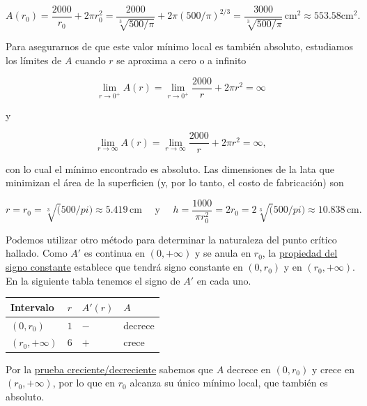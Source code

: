 \documentclass[
  letterpaper,
]{book}
\theoremstyle{plain}
\theoremstyle{remark}
\begin{document}
\begin{tcolorbox}
\[
A(r_0)=\frac{2000}{r_0}+2\pi r_0^2=\frac{2000}{\sqrt[3]{500/\pi}}+2\pi (500/\pi)^{2/3}=\frac{3000}{\sqrt[3]{500/\pi}}\, \mathrm{cm}^2 \approx 553.58 \mathrm{cm}^2.
\]

Para asegurarnos de que este valor mínimo local es también absoluto,
estudiamos los límites de \(A\) cuando \(r\) se aproxima a cero o a
infinito

\[
\lim_{r\to 0^+} A(r)=\lim_{r\to 0^+} \frac{2000}{r}+2\pi r^2=\infty
\]

y

\[
\lim_{r\to \infty} A(r)=\lim_{r\to \infty} \frac{2000}{r}+2\pi r^2=\infty,
\]

con lo cual el mínimo encontrado es absoluto. Las dimensiones de la lata
que minimizan el área de la superficien (y, por lo tanto, el costo de
fabricación) son

\[
r=r_0=\sqrt[3](500/pi)\approx 5.419 \,\mathrm{cm} \quad \text{ y } \quad h=\frac{1000}{\pi r_0^2}=2r_0=2\sqrt[3](500/pi)\approx 10.838 \,\mathrm{cm}.
\]

\end{tcolorbox}

\begin{tcolorbox}[enhanced jigsaw, opacityback=0, left=2mm, opacitybacktitle=0.6, toprule=.15mm, bottomrule=.15mm, colbacktitle=quarto-callout-caution-color!10!white, titlerule=0mm, bottomtitle=1mm, title=\textcolor{quarto-callout-caution-color}{\faFire}\hspace{0.5em}{Importante}, toptitle=1mm, colframe=quarto-callout-caution-color-frame, colback=white, breakable, rightrule=.15mm, arc=.35mm, leftrule=.75mm, coltitle=black]

Podemos utilizar otro método para determinar la naturaleza del punto
crítico hallado. Como \(A'\) es continua en \((0,+\infty)\) y se anula
en \(r_0\), la \hyperref[teo-prueba-signoconst]{propiedad del signo
constante} establece que tendrá signo constante en \((0,r_0)\) y en
\((r_0,+\infty)\). En la siguiente tabla tenemos el signo de \(A'\) en
cada uno.

\begin{longtable}[]{@{}llll@{}}
\toprule\noalign{}
Intervalo & \(r\) & \(A'(r)\) & \(A\) \\
\midrule\noalign{}
\endhead
\bottomrule\noalign{}
\endlastfoot
\((0,r_0)\) & \(1\) & \(-\) & decrece \\
\((r_0,+\infty)\) & \(6\) & \(+\) & crece \\
\end{longtable}

Por la \hyperref[teo-prueba-cd]{prueba creciente/decreciente} sabemos
que \(A\) decrece en \((0,r_0)\) y crece en \((r_0,+\infty)\), por lo
que en \(r_0\) alcanza su único mínimo local, que también es absoluto.

\end{tcolorbox}
\end{document}
